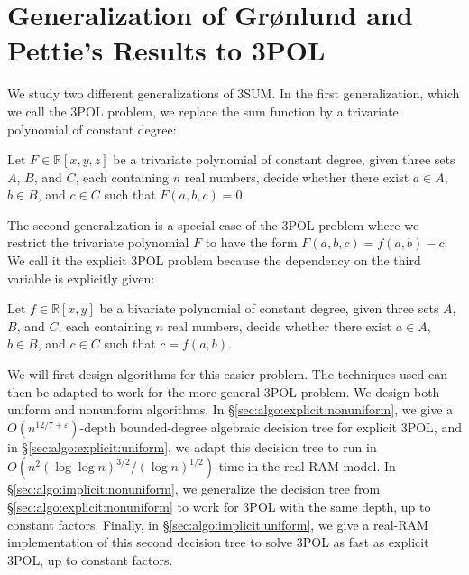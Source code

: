 \section{Generalization of Gr\o nlund and Pettie's Results to 3POL}

We study two different generalizations of 3SUM\@. In the first generalization,
which we call the 3POL problem, we replace the sum function by a trivariate
polynomial of constant degree:
\begin{problem}[3POL]
Let $F \in \mathbb{R}[x,y,z]$ be a trivariate polynomial of constant degree,
given three sets $A$, $B$, and $C$, each containing $n$ real numbers, decide
whether there exist $a \in A$, $b \in B$, and $c \in C$ such that
$F(a,b,c)=0$.
\end{problem}
The second generalization is a special case of the 3POL problem where we
restrict the trivariate polynomial $F$ to have the form $F(a,b,c) = f(a,b) -
c$. We call it the explicit 3POL problem because the dependency on the third
variable is explicitly given:
\begin{problem}
Let $f \in \mathbb{R}[x,y]$ be a bivariate polynomial of constant degree,
given three sets $A$, $B$, and $C$, each containing $n$ real numbers, decide
whether there exist $a \in A$, $b \in B$, and $c \in C$ such that $c=f(a,b)$.
\end{problem}
We will first design algorithms for this easier problem. The techniques used can
then be adapted to work for the more general 3POL problem. We design both
uniform and nonuniform algorithms.
%
In \S\ref{sec:algo:explicit:nonuniform},
we give a $O(n^{12/7+\varepsilon})$-depth bounded-degree
algebraic decision tree for explicit 3POL, and in
\S\ref{sec:algo:explicit:uniform}, we adapt this decision tree
to run in $O(n^2 {(\log \log n)}^{3/2} / {(\log n)}^{1/2})$-time
in the real-RAM model.
%
In \S\ref{sec:algo:implicit:nonuniform}, we generalize the decision tree from
\S\ref{sec:algo:explicit:nonuniform} to work for 3POL with the same depth, up
to constant factors.
%
Finally, in \S\ref{sec:algo:implicit:uniform}, we give a real-RAM
implementation of this second decision tree to solve 3POL as fast as
explicit 3POL, up to constant factors.
